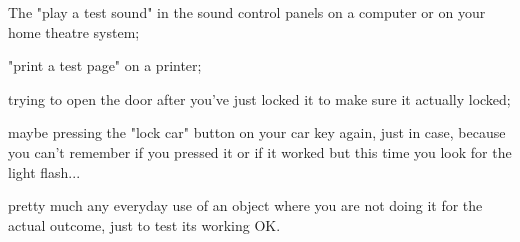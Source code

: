 \documentclass[online,helvetica]{chaksem}
\begin{document}
The "play a test sound" in the sound control panels on a computer or on your home theatre                                                                      
system;                                                                                                                                                        
                                                                                                                                                               
"print a test page" on a printer;                                                                                                                              
                                                                                                                                                               
trying to open the door after you've                                                                                                                           
just locked it to make sure it actually locked;                                                                                                                
                                                                                                                                                               
maybe pressing the "lock car"                                                                                                                                  
button on your car key again, just in case, because you can't remember if you                                                                                  
pressed it or if it worked but this time you look for the light flash...                                                                                       
                                                                                                                                                               
pretty much any everyday use of an object where you are not doing it for the actual                                                                            
outcome, just to test its working OK.                                                                                                                          
                                                                                                                                                               
\end{document}
